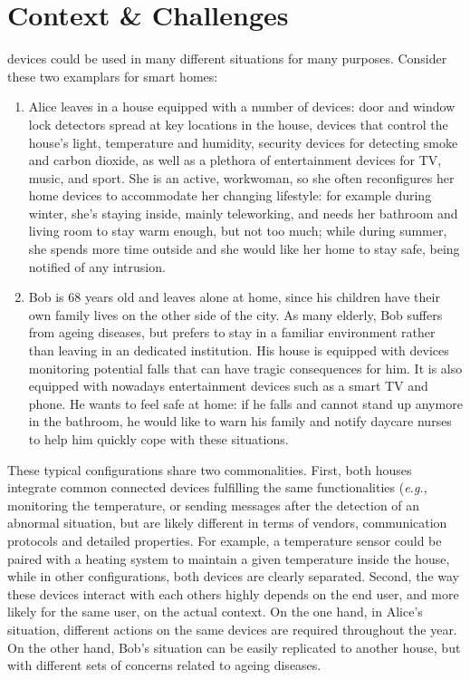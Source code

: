 \section{Context \& Challenges}
\label{sec:Context-Challenges}

\IOT devices could be used in many different situations for many purposes. Consider these two examplars for smart homes:
\begin{enumerate}
	\item Alice leaves in a house equipped with a number of devices: door and window lock detectors spread at key locations in the house, devices that control the house's light, temperature and humidity, security devices for detecting smoke and carbon dioxide, as well as a plethora of entertainment devices for TV, music, and sport. She is an active, workwoman, so she often reconfigures her home devices to accommodate her changing lifestyle: for example during winter, she's staying inside, mainly teleworking, and needs her bathroom and living room to stay warm enough, but not too much; while during summer, she spends more time outside and she would like her home to stay safe, being notified of any intrusion.
	
	\item Bob is 68 years old and leaves alone at home, since his children have their own family lives on the other side of the city. As many elderly, Bob suffers from ageing diseases, but prefers to stay in a familiar environment rather than leaving in an dedicated institution. His house is equipped with devices monitoring potential falls that can have tragic consequences for him. It is also equipped with nowadays entertainment devices such as a smart TV and phone. He wants to feel safe at home: if he falls and cannot stand up anymore in the bathroom, he would like to warn his family and notify daycare nurses to help him quickly cope with these situations.
\end{enumerate}

These typical configurations share two commonalities. First, both houses integrate common connected devices fulfilling the same functionalities (\textit{e.g.}, monitoring the temperature, or sending messages after the detection of an abnormal situation, but are likely different in terms of vendors, communication protocols and detailed properties. For example, a temperature sensor could be paired with a heating system to maintain a given temperature inside the house, while in other configurations, both devices are clearly separated. Second, the way these devices interact with each others highly depends on the end user, and more likely for the same user, on the actual context. On the one hand, in Alice's situation, different actions on the same devices are required throughout the year. On the other hand, Bob's situation can be easily replicated to another house, but with different sets of concerns related to ageing diseases.

